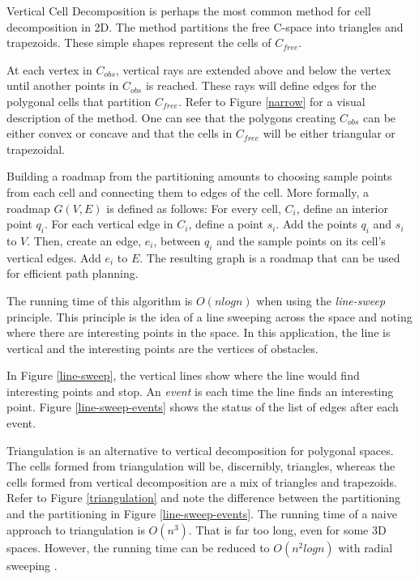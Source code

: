 \documentclass[10pt,conference]{ieeeconf}
\begin{document}
Vertical Cell Decomposition \cite{vert_cell_decomp} is perhaps the most common method for cell decomposition in 2D. The method partitions the free C-space into triangles and trapezoids. These simple shapes represent the cells of $C_{free}$. 

At each vertex in $C_{obs}$, vertical rays are extended above and below the vertex until another points in $C_{obs}$ is reached. These rays will define edges for the polygonal cells that partition $C_{free}$. Refer to Figure \ref{narrow} for a visual description of the method. One can see that the polygons creating $C_{obs}$ can be either convex or concave and that the cells in $C_{free}$ will be either triangular or trapezoidal. 

Building a roadmap from the partitioning amounts to choosing sample points from each cell and connecting them to edges of the cell. More formally, a roadmap $G(V,E)$ is defined as follows: For every cell, $C_i$, define an interior point $q_i$. For each vertical edge in $C_i$, define a point $s_i$. Add the points $q_i$ and $s_i$ to $V$. Then, create an edge, $e_i$, between $q_i$ and the sample points on its cell's vertical edges. Add $e_i$ to $E$. The resulting graph is a roadmap that can be used for efficient path planning.

The running time of this algorithm is $O(nlogn)$ when using the \emph{line-sweep} principle. This principle is the idea of a line sweeping across the space and noting where there are interesting points in the space. In this application, the line is vertical and the interesting points are the vertices of obstacles.

In Figure \ref{line-sweep}, the vertical lines show where the line would find interesting points and stop. An \emph{event} is each time the line finds an interesting point. Figure \ref{line-sweep-events} shows the status of the list of edges after each event.

Triangulation \cite{something} is an alternative to vertical decomposition for polygonal spaces. The cells formed from triangulation will be, discernibly, triangles, whereas the cells formed from vertical decomposition are a mix of triangles and trapezoids. Refer to Figure \ref{triangulation} and note the difference between the partitioning and the partitioning in Figure \ref{line-sweep-events}. The running time of a naive approach to triangulation is $O(n^3)$. That is far too long, even for some 3D spaces. However, the running time can be reduced to $O(n^2logn)$ with radial sweeping \cite{something}.
\end{document}
